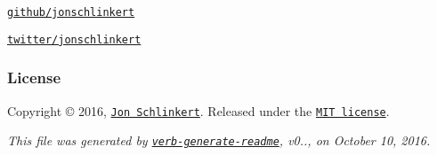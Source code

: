 \begin{DoxyItemize}
\item \href{https://github.com/jonschlinkert}{\tt github/jonschlinkert}
\item \href{http://twitter.com/jonschlinkert}{\tt twitter/jonschlinkert}
\end{DoxyItemize}

\subsubsection*{License}

Copyright © 2016, \href{https://github.com/jonschlinkert}{\tt Jon Schlinkert}. Released under the \href{https://github.com/jonschlinkert/snapdragon/blob/master/LICENSE}{\tt M\+IT license}.





{\itshape This file was generated by \href{https://github.com/verbose/verb-generate-readme}{\tt verb-\/generate-\/readme}, v0.., on October 10, 2016.} 